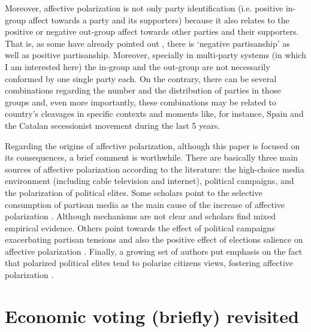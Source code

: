 \documentclass[a4paper, svgnames]{article}
\begin{document}
Moreover, affective polarization is not only party identification (i.e. positive in-group affect towards a party and its supporters) because it also relates to the positive or negative out-group affect towards other parties and their supporters. That is, as some have already pointed out \citep{Medeiros2013, Abramowitz2016}, there is `negative partisanship' as well as positive partisanship. Moreover, specially in multi-party systems (in which I am interested here) the in-group and the out-group are not necessarily conformed by one single party each. On the contrary, there can be several combinations regarding the number and the distribution of parties in those groups and, even more importantly, these combinations may be related to country's cleavages in specific contexts and moments like, for instance, Spain and the Catalan secessionist movement during the last 5 years.

Regarding the origins of affective polarization, although this paper is focused on its consequences, a brief comment is worthwhile. There are basically three main sources of affective polarization according to the literature: the high-choice media environment (including cable television and internet), political campaigns, and the polarization of political elites. Some scholars point to the selective consumption of partisan media as the main cause of the increase of affective polarization \citep{Garrett2014, Lelkes2017}. Although mechanisms are not clear and scholars find mixed empirical evidence. Others point towards the effect of political campaigns exacerbating partisan tensions \citep{Sood} and also the positive effect of elections salience on affective polarization \citep{Hernandez2021}. Finally, a growing set of authors put emphasis on the fact that polarized political elites tend to polarize citizens views, fostering affective polarization \citep{Druckman2013, Gidron2018, Rodriguez-Teruel2021}.



\section{Economic voting (briefly) revisited}
\end{document}
